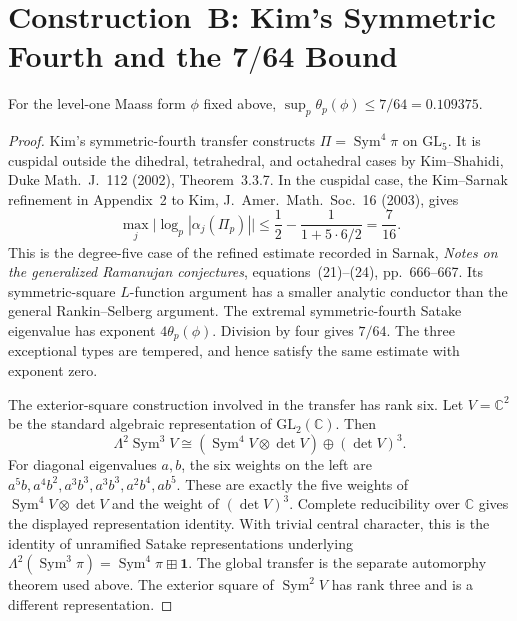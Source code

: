 \section{Construction~B: Kim's Symmetric Fourth and the \(\mathbf{7/64}\) Bound}
\label{v4-arith:w10-c:construction-B}

\begin{theorem}
\label{v4-arith:w10-c:thm:KS-7-64}
For the level-one Maass form \(\phi\) fixed above,
\(\sup_p\theta_p(\phi)\leq7/64=0.109375\).
\end{theorem}

\begin{proof}
Kim's symmetric-fourth transfer constructs
\(\Pi=\operatorname{Sym}^4\pi\) on \(\mathrm{GL}_5\).
It is cuspidal outside the dihedral, tetrahedral, and octahedral
cases by Kim--Shahidi, Duke Math.~J.~112 (2002), Theorem~3.3.7.
In the cuspidal case, the Kim--Sarnak refinement in Appendix~2
to Kim, J.~Amer.~Math.~Soc.~16 (2003), gives
\[
\max_j\bigl|\log_p|\alpha_j(\Pi_p)|\bigr|
\leq\frac12-\frac1{1+5\cdot6/2}=\frac7{16}.
\]
This is the degree-five case of the refined estimate recorded in
Sarnak, \emph{Notes on the generalized Ramanujan conjectures},
equations~(21)--(24), pp.~666--667.
Its symmetric-square \(L\)-function argument has a smaller analytic
conductor than the general Rankin--Selberg argument.
The extremal symmetric-fourth Satake eigenvalue has exponent
\(4\theta_p(\phi)\). Division by four gives \(7/64\).
The three exceptional types are tempered, and hence satisfy the
same estimate with exponent zero.

The exterior-square construction involved in the transfer has
rank six. Let \(V=\mathbb C^2\) be the standard algebraic
representation of \(\mathrm{GL}_2(\mathbb C)\). Then
\[
\Lambda^2\operatorname{Sym}^3V
\cong(\operatorname{Sym}^4V\otimes\det V)\oplus(\det V)^3.
\]
For diagonal eigenvalues \(a,b\), the six weights on the left are
\(a^5b,a^4b^2,a^3b^3,a^3b^3,a^2b^4,ab^5\).
These are exactly the five weights of
\(\operatorname{Sym}^4V\otimes\det V\) and the weight of
\((\det V)^3\). Complete reducibility over \(\mathbb C\) gives
the displayed representation identity.
With trivial central character, this is the identity of unramified
Satake representations underlying
\(\Lambda^2(\operatorname{Sym}^3\pi)
=\operatorname{Sym}^4\pi\boxplus\mathbf1\).
The global transfer is the separate automorphy theorem used above.
The exterior square of \(\operatorname{Sym}^2V\) has rank three
and is a different representation.
\end{proof}


